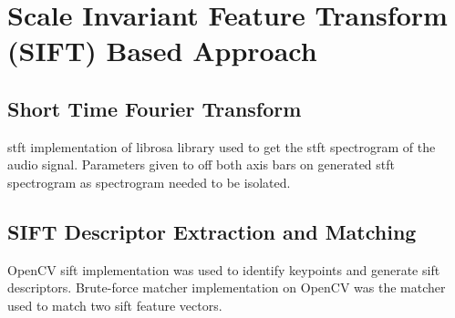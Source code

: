 \section{Scale Invariant Feature Transform (SIFT) Based Approach}

\subsection{Short Time Fourier Transform}
\ac{stft} implementation of librosa\cite{librosa} library used to get the
\ac{stft} spectrogram of the audio signal. Parameters given to off both axis bars
on generated \ac{stft} spectrogram as spectrogram needed to be isolated.  

\subsection{SIFT Descriptor Extraction and Matching}
OpenCV\cite{opencv} \ac{sift} implementation was used to identify keypoints and
generate \ac{sift} descriptors. Brute-force matcher implementation on OpenCV\cite{opencv} was the matcher used 
to match two \ac{sift} feature vectors. 

